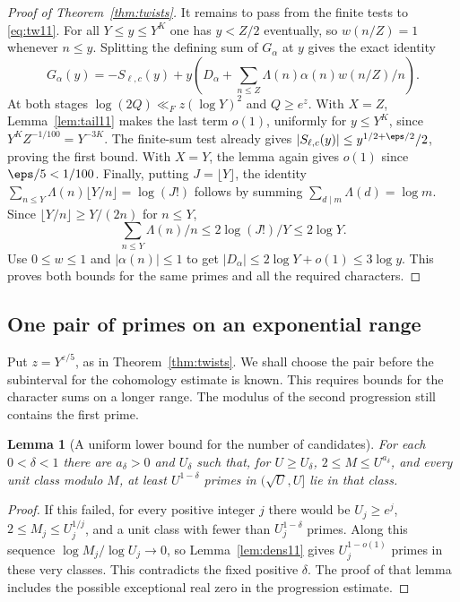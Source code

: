 \documentclass[a4paper,11pt]{article}
\newtheorem{lemma}[proposition]{Lemma}
\theoremstyle{definition}
\theoremstyle{remark}
\numberwithin{equation}{section}
\begin{document}
\begin{proof}[Proof of Theorem~\ref{thm:twists}]
It remains to pass from the finite tests to \eqref{eq:tw11}. For all \(Y\le y\le Y^K\) one has \(y<Z/2\) eventually, so \(w(n/Z)=1\) whenever \(n\le y\). Splitting the defining sum of \(G_\alpha\) at \(y\) gives the exact identity
\[
 G_\alpha(y)=-S_{\ell,c}(y)
    +y\left(D_\alpha+\sum_{n\le Z}\Lambda(n)\alpha(n)w(n/Z)/n\right).
\]
At both stages \(\log(2Q)\ll_F z(\log Y)^2\) and \(Q\ge e^z\). With \(X=Z\), Lemma~\ref{lem:tail11} makes the last term \(o(1)\), uniformly for \(y\le Y^K\), since \(Y^K Z^{-1/100}=Y^{-3K}\). The finite-sum test already gives \(|S_{\ell,c}(y)|\le y^{1/2+\eps/2}/2\), proving the first bound. With \(X=Y\), the lemma again gives \(o(1)\) since \(\eps/5<1/100\). Finally, putting \(J=\lfloor Y\rfloor\), the identity \(\sum_{n\le Y}\Lambda(n)\lfloor Y/n\rfloor=\log(J!)\) follows by summing \(\sum_{d\mid m}\Lambda(d)=\log m\). Since \(\lfloor Y/n\rfloor\ge Y/(2n)\) for \(n\le Y\),
\[
           \sum_{n\le Y}\Lambda(n)/n\le 2\log(J!)/Y\le2\log Y .
\]
Use \(0\le w\le1\) and \(|\alpha(n)|\le1\) to get \(|D_\alpha|\le2\log Y+o(1)\le3\log y\). This proves both bounds for the same primes and all the required characters.
\end{proof}

\subsection{One pair of primes on an exponential range}\label{nav:I-21}
Put \(z=Y^{\varepsilon/5}\), as in Theorem~\ref{thm:twists}.
We shall choose the pair before the subinterval for the cohomology
estimate is known. This requires bounds for the character sums on
a longer range. The modulus of the second progression still contains
the first prime.

\begin{lemma}[A uniform lower bound for the number of candidates]
\label{lem:many232}
For each \(0<\delta<1\) there are \(a_\delta>0\) and
\(U_\delta\) such that, for \(U\ge U_\delta\), \(2\le M\le
U^{a_\delta}\), and every unit class modulo \(M\), at least
\(U^{1-\delta}\) primes in \((\sqrt U,U]\) lie in that class.
\end{lemma}
\begin{proof}
If this failed, for every positive integer \(j\) there would
be \(U_j\ge e^j\), \(2\le M_j\le U_j^{1/j}\), and a unit class
with fewer than \(U_j^{1-\delta}\) primes. Along this sequence
\(\log M_j/\log U_j\to0\), so Lemma~\ref{lem:dens11} gives
\(U_j^{1-o(1)}\) primes in these very classes. This contradicts
the fixed positive \(\delta\). The proof of that lemma includes
the possible exceptional real zero in the progression estimate.
\end{proof}
\end{document}
